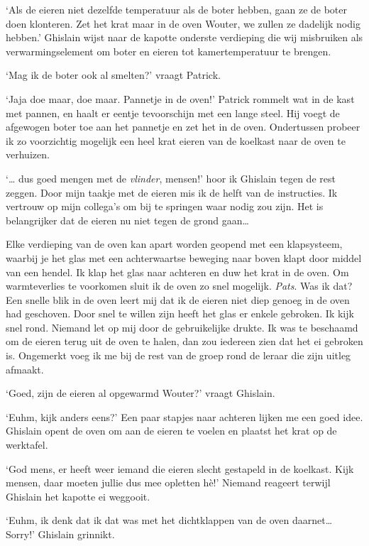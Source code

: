 \documentclass[
  11pt,
  dutch,
]{memoir}
\begin{document}
`Als de eieren niet dezelfde temperatuur als de boter hebben, gaan ze de
boter doen klonteren. Zet het krat maar in de oven Wouter, we zullen ze
dadelijk nodig hebben.' Ghislain wijst naar de kapotte onderste
verdieping die wij misbruiken als verwarmingselement om boter en eieren
tot kamertemperatuur te brengen.

`Mag ik de boter ook al smelten?' vraagt Patrick.

`Jaja doe maar, doe maar. Pannetje in de oven!' Patrick rommelt wat in
de kast met pannen, en haalt er eentje tevoorschijn met een lange steel.
Hij voegt de afgewogen boter toe aan het pannetje en zet het in de oven.
Ondertussen probeer ik zo voorzichtig mogelijk een heel krat eieren van
de koelkast naar de oven te verhuizen.

`\ldots{} dus goed mengen met de \emph{vlinder}, mensen!' hoor ik
Ghislain tegen de rest zeggen. Door mijn taakje met de eieren mis ik de
helft van de instructies. Ik vertrouw op mijn collega's om bij te
springen waar nodig zou zijn. Het is belangrijker dat de eieren nu niet
tegen de grond gaan\ldots{}

Elke verdieping van de oven kan apart worden geopend met een
klapsysteem, waarbij je het glas met een achterwaartse beweging naar
boven klapt door middel van een hendel. Ik klap het glas naar achteren
en duw het krat in de oven. Om warmteverlies te voorkomen sluit ik de
oven zo snel mogelijk. \emph{Pats}. Was ik dat? Een snelle blik in de
oven leert mij dat ik de eieren niet diep genoeg in de oven had
geschoven. Door snel te willen zijn heeft het glas er enkele gebroken.
Ik kijk snel rond. Niemand let op mij door de gebruikelijke drukte. Ik
was te beschaamd om de eieren terug uit de oven te halen, dan zou
iedereen zien dat het ei gebroken is. Ongemerkt voeg ik me bij de rest
van de groep rond de leraar die zijn uitleg afmaakt.

`Goed, zijn de eieren al opgewarmd Wouter?' vraagt Ghislain.

`Euhm, kijk anders eens?' Een paar stapjes naar achteren lijken me een
goed idee. Ghislain opent de oven om aan de eieren te voelen en plaatst
het krat op de werktafel.

`God mens, er heeft weer iemand die eieren slecht gestapeld in de
koelkast. Kijk mensen, daar moeten jullie dus mee opletten hè!' Niemand
reageert terwijl Ghislain het kapotte ei weggooit.

`Euhm, ik denk dat ik dat was met het dichtklappen van de oven
daarnet\ldots{} Sorry!' Ghislain grinnikt.
\end{document}
